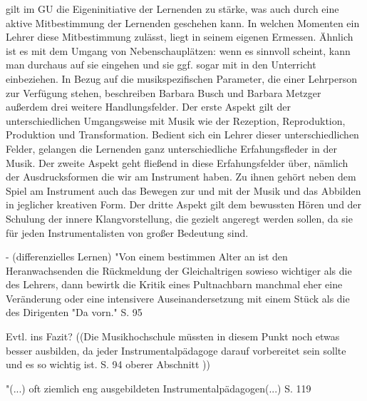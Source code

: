 gilt im GU die Eigeninitiative der Lernenden zu stärke, was auch durch eine aktive
Mitbestimmung der Lernenden geschehen kann. In welchen Momenten ein Lehrer diese
Mitbestimmung zulässt, liegt in seinem eigenen Ermessen. Ähnlich ist es mit dem
Umgang von Nebenschauplätzen: wenn es sinnvoll scheint, kann man durchaus auf
sie eingehen und sie ggf. sogar mit in den Unterricht einbeziehen. In Bezug auf
die musikspezifischen Parameter, die einer Lehrperson zur Verfügung stehen,
beschreiben Barbara Busch und Barbara Metzger außerdem drei weitere
Handlungsfelder. Der erste Aspekt gilt der unterschiedlichen Umgangsweise mit
Musik wie der Rezeption, Reproduktion, Produktion und Transformation. Bedient
sich ein Lehrer dieser unterschiedlichen Felder, gelangen die Lernenden ganz
unterschiedliche Erfahungsfleder in der Musik. Der zweite Aspekt geht fließend
in diese Erfahungsfelder über, nämlich der Ausdrucksformen die wir am Instrument
haben. Zu ihnen gehört neben dem Spiel am Instrument auch das Bewegen zur und
mit der Musik und das Abbilden in jeglicher kreativen Form. Der dritte Aspekt
gilt dem bewussten Hören und der Schulung der innere Klangvorstellung, die
gezielt angeregt werden sollen, da sie für
jeden Instrumentalisten von großer Bedeutung sind.

- (differenzielles Lernen)
"Von einem bestimmen Alter an ist den Heranwachsenden die Rückmeldung der
Gleichaltrigen sowieso wichtiger als die des Lehrers, dann bewirtk die Kritik
eines Pultnachbarn manchmal eher eine Veränderung oder eine intensivere
Auseinandersetzung mit einem Stück als die des Dirigenten "Da vorn." S. 95


Evtl. ins Fazit? ((Die Musikhochschule müssten in diesem Punkt noch etwas besser ausbilden, da
jeder Instrumentalpädagoge darauf vorbereitet sein sollte und es so wichtig ist.
S. 94 oberer Abschnitt ))

"(...) oft ziemlich eng ausgebildeten Instrumentalpädagogen(...) S. 119
